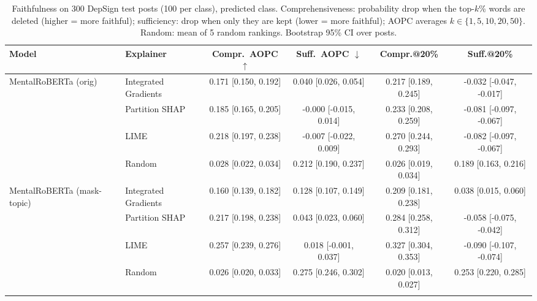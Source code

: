 \begin{table}[t]
\centering
\caption{Faithfulness on 300 DepSign test posts (100 per class), predicted class. Comprehensiveness: probability drop when the top-$k$\% words are deleted (higher = more faithful); sufficiency: drop when only they are kept (lower = more faithful); AOPC averages $k\in\{1,5,10,20,50\}$. Random: mean of 5 random rankings. Bootstrap 95\% CI over posts.}
\label{tab:faith}
\scriptsize
\setlength{\tabcolsep}{3pt}
\begin{tabular}{llcccc}
\toprule
Model & Explainer & Compr.\ AOPC $\uparrow$ & Suff.\ AOPC $\downarrow$ & Compr.@20\% & Suff.@20\% \\
\midrule
MentalRoBERTa (orig) & Integrated Gradients & 0.171 \tiny[0.150, 0.192] & 0.040 \tiny[0.026, 0.054] & 0.217 \tiny[0.189, 0.245] & -0.032 \tiny[-0.047, -0.017] \\
 & Partition SHAP & 0.185 \tiny[0.165, 0.205] & -0.000 \tiny[-0.015, 0.014] & 0.233 \tiny[0.208, 0.259] & -0.081 \tiny[-0.097, -0.067] \\
 & LIME & 0.218 \tiny[0.197, 0.238] & -0.007 \tiny[-0.022, 0.009] & 0.270 \tiny[0.244, 0.293] & -0.082 \tiny[-0.097, -0.067] \\
 & Random & 0.028 \tiny[0.022, 0.034] & 0.212 \tiny[0.190, 0.237] & 0.026 \tiny[0.019, 0.034] & 0.189 \tiny[0.163, 0.216] \\
\addlinespace[2pt]
MentalRoBERTa (mask-topic) & Integrated Gradients & 0.160 \tiny[0.139, 0.182] & 0.128 \tiny[0.107, 0.149] & 0.209 \tiny[0.181, 0.238] & 0.038 \tiny[0.015, 0.060] \\
 & Partition SHAP & 0.217 \tiny[0.198, 0.238] & 0.043 \tiny[0.023, 0.060] & 0.284 \tiny[0.258, 0.312] & -0.058 \tiny[-0.075, -0.042] \\
 & LIME & 0.257 \tiny[0.239, 0.276] & 0.018 \tiny[-0.001, 0.037] & 0.327 \tiny[0.304, 0.353] & -0.090 \tiny[-0.107, -0.074] \\
 & Random & 0.026 \tiny[0.020, 0.033] & 0.275 \tiny[0.246, 0.302] & 0.020 \tiny[0.013, 0.027] & 0.253 \tiny[0.220, 0.285] \\
\addlinespace[2pt]
\bottomrule
\end{tabular}
\end{table}
